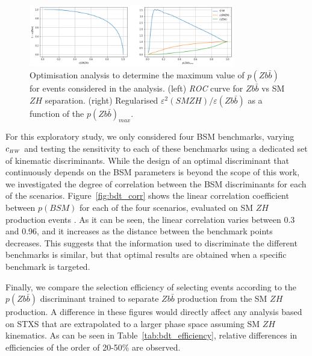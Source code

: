 \begin{figure}
\centering
\includegraphics[width=0.8\textwidth]{plots/bkg_cut_opt.png}
\caption{
\label{fig:s2_over_b}
Optimisation analysis to determine the maximum value of $p(Z b\bar{b})$ for events
considered in the analysis. (left) {\it ROC} curve for $Z b\bar{b}$ vs SM $Z H$
separation. (right) Regularised $\varepsilon^2(SM Z H) /
\varepsilon(Zb\bar{b})$ as a function of the $p(Z b\bar{b})_{max}$.
}
\end{figure}

For this exploratory study, we only considered four BSM benchmarks, varying $c_{\scriptscriptstyle HW}$ and testing the
sensitivity to each of these benchmarks using a dedicated set of kinematic
discriminants. While the design of an optimal discriminant that continuously depends on
the BSM parameters is beyond the scope of this work, we investigated the degree of
correlation between the BSM discriminants for each of the scenarios.
Figure~\ref{fig:bdt_corr} shows the linear correlation coefficient between $p(BSM)$ for
each of the four scenarios, evaluated on SM $Z H$ production events . As it can be seen,
the linear correlation varies between 0.3 and 0.96, and it increases as the distance
between the benchmark points decreases. This suggests that the information used to
discriminate the different benchmarks is similar, but that optimal results are obtained
when a specific benchmark is targeted.

Finally, we compare the selection efficiency of selecting events according to the $p(Z
b\bar{b})$ discriminant trained to separate $Z b\bar{b}$ production from the SM $Z H$
production.  A difference in these figures would directly affect any analysis based on STXS that are extrapolated to a larger phase space assuming SM $Z
H$ kinematics. As can be seen in Table~\ref{tab:bdt_efficiency}, relative differences in efficiencies of the order of 20-50\% are observed. 
%

